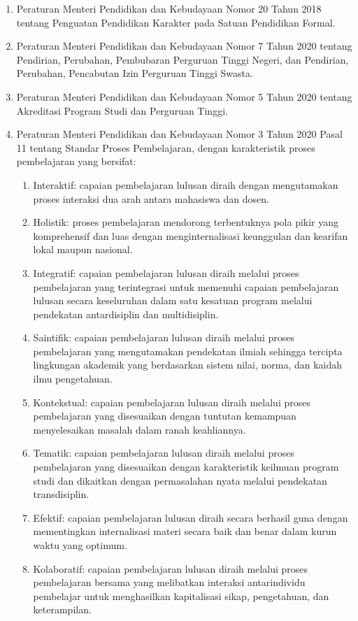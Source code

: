 \begin{enumerate}
\item Peraturan Menteri Pendidikan dan Kebudayaan Nomor 20 Tahun 2018 tentang Penguatan Pendidikan Karakter pada Satuan Pendidikan Formal.
\item Peraturan Menteri Pendidikan dan Kebudayaan Nomor 7 Tahun 2020 tentang Pendirian, Perubahan, Pembubaran Perguruan Tinggi Negeri, dan Pendirian, Perubahan, Pencabutan Izin Perguruan Tinggi Swasta.
\item Peraturan Menteri Pendidikan dan Kebudayaan Nomor 5 Tahun 2020 tentang Akreditasi Program Studi dan Perguruan Tinggi.
\item Peraturan Menteri Pendidikan dan Kebudayaan Nomor 3 Tahun 2020 Pasal 11 tentang Standar Proses Pembelajaran, dengan karakteristik proses pembelajaran yang bersifat:
  \begin{enumerate}
  \item Interaktif: capaian pembelajaran lulusan diraih dengan mengutamakan proses interaksi dua arah antara mahasiswa dan dosen.
  \item Holistik: proses pembelajaran mendorong terbentuknya pola pikir yang komprehensif dan luas dengan menginternalisasi keunggulan dan kearifan lokal maupun nasional.
  \item Integratif: capaian pembelajaran lulusan diraih melalui proses pembelajaran yang terintegrasi untuk memenuhi capaian pembelajaran lulusan secara keseluruhan dalam satu kesatuan program melalui pendekatan antardisiplin dan multidisiplin.
  \item Saintifik: capaian pembelajaran lulusan diraih melalui proses pembelajaran yang mengutamakan pendekatan ilmiah sehingga tercipta lingkungan akademik yang berdasarkan sistem nilai, norma, dan kaidah ilmu pengetahuan.
  \item Kontekstual: capaian pembelajaran lulusan diraih melalui proses pembelajaran yang disesuaikan dengan tuntutan kemampuan menyelesaikan masalah dalam ranah keahliannya.
  \item Tematik: capaian pembelajaran lulusan diraih melalui proses pembelajaran yang disesuaikan dengan karakteristik keilmuan program studi dan dikaitkan dengan permasalahan nyata melalui pendekatan transdisiplin.
  \item Efektif: capaian pembelajaran lulusan diraih secara berhasil guna dengan mementingkan internalisasi materi secara baik dan benar dalam kurun waktu yang optimum.
  \item Kolaboratif: capaian pembelajaran lulusan diraih melalui proses pembelajaran bersama yang melibatkan interaksi antarindividu pembelajar untuk menghasilkan kapitalisasi sikap, pengetahuan, dan keterampilan.

\end{enumerate}
\end{enumerate}

